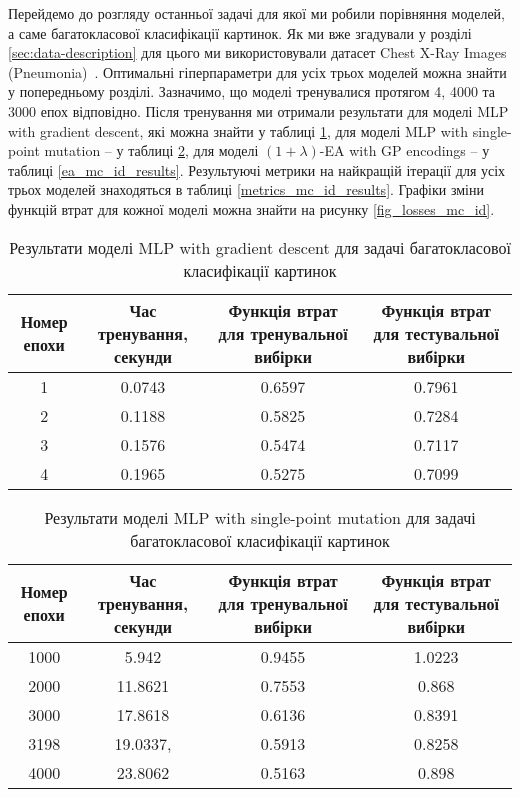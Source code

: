 Перейдемо до розгляду останньої задачі для якої ми робили порівняння моделей, а саме багатокласової класифікації картинок. Як ми вже згадували у розділі \ref{sec:data-description} для цього ми використовували датасет Chest X-Ray Images (Pneumonia)~\cite{ct32}. Оптимальні гіперпараметри для усіх трьох моделей можна знайти у попередньому розділі. Зазначимо, що моделі тренувалися протягом 4, 4000 та 3000 епох відповідно. Після тренування ми отримали результати для моделі MLP with gradient descent, які можна знайти у таблиці \ref{mlp_gd_mc_id_results}, для моделі MLP with single-point mutation -- у таблиці \ref{mlp_spm_mc_id_results}, для моделі $(1+\lambda)$-EA with GP encodings -- у таблиці \ref{ea_mc_id_results}. Результуючі метрики на найкращій ітерації для усіх трьох моделей знаходяться в таблиці \ref{metrics_mc_id_results}. Графіки зміни функцій втрат для кожної моделі можна знайти на рисунку \ref{fig_losses_mc_id}.

\begin{table}[ht]
	\caption{Результати моделі MLP with gradient descent для задачі багатокласової класифікації картинок}
	\label{mlp_gd_mc_id_results}
	\centering
	\begin{adjustbox}{max width=\textwidth}
		\begin{tabular}{|c|c|c|c|}
			\hline 
			Номер епохи & Час тренування, секунди & Функція втрат для тренувальної вибірки & Функція втрат для тестувальної вибірки \\
			\hline 
			1 & 0.0743 & 0.6597 & 0.7961 \\
			\hline 
			2 & 0.1188 & 0.5825 & 0.7284 \\
			\hline
			3 & 0.1576 & 0.5474 & 0.7117 \\
			\hline
			4 & 0.1965 & 0.5275 & 0.7099 \\
			\hline
		\end{tabular}
	\end{adjustbox}
\end{table}

\begin{table}[ht]
	\caption{Результати моделі MLP with single-point mutation для задачі багатокласової класифікації картинок}
	\label{mlp_spm_mc_id_results}
	\centering
	\begin{adjustbox}{max width=\textwidth}
		\begin{tabular}{|c|c|c|c|}
			\hline 
			Номер епохи & Час тренування, секунди & Функція втрат для тренувальної вибірки & Функція втрат для тестувальної вибірки \\
			\hline 
			1000 & 5.942 & 0.9455 & 1.0223 \\
			\hline 
			2000 & 11.8621 & 0.7553 & 0.868 \\
			\hline
			3000 & 17.8618 & 0.6136 & 0.8391 \\
			\hline
			3198 & 19.0337, & 0.5913 & 0.8258 \\
			\hline
			4000 & 23.8062 & 0.5163 & 0.898 \\
			\hline
		\end{tabular}
	\end{adjustbox}
\end{table}

